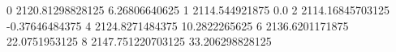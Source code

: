 0 2120.81298828125 6.26806640625
1 2114.544921875 0.0
2 2114.16845703125 -0.37646484375
4 2124.8271484375 10.2822265625
6 2136.6201171875 22.0751953125
8 2147.751220703125 33.206298828125
